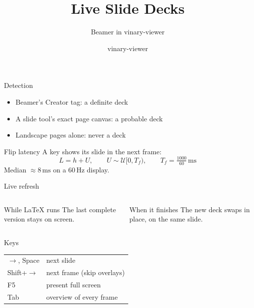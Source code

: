 \documentclass[aspectratio=169]{beamer}
\title{Live Slide Decks}
\subtitle{Beamer in vinary-viewer}
\author{vinary-viewer}
\date{}
\begin{document}
\begin{frame}
  \titlepage
\end{frame}

\begin{frame}{Detection}
  \begin{itemize}
    \item<1-> Beamer's Creator tag: a \alert{definite} deck
    \item<2-> A slide tool's exact page canvas: a \alert{probable} deck
    \item<3-> Landscape pages alone: \alert{never} a deck
  \end{itemize}
\end{frame}

\begin{frame}{Flip latency}
  A key shows its slide in the next frame:
  \[
    L = h + U, \qquad U \sim \mathcal{U}[0, T_f), \qquad T_f = \tfrac{1000}{60}\,\mathrm{ms}
  \]
  \pause
  Median $\approx 8\,\mathrm{ms}$ on a 60\,Hz display.
\end{frame}

\begin{frame}{Live refresh}
  \begin{columns}
      \begin{block}{While LaTeX runs}
        The last complete version stays on screen.
      \end{block}
      \begin{block}{When it finishes}
        The new deck swaps in place, on the same slide.
      \end{block}
  \end{columns}
\end{frame}

\begin{frame}{Keys}
  \begin{tabular}{ll}
    \(\rightarrow\), Space & next slide \\
    Shift+\(\rightarrow\) & next frame (skip overlays) \\
    F5 & present full screen \\
    Tab & overview of every frame
  \end{tabular}
\end{frame}
\end{document}
